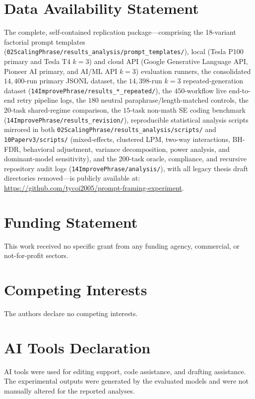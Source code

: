 \documentclass[a4paper,fleqn]{cas-sc}
\begin{document}
\section{Data Availability Statement}\label{data-availability-statement}

The complete, self-contained replication package—comprising the 18-variant factorial prompt templates (\texttt{02ScalingPhrase/results\_analysis/prompt\_templates/}), local (Tesla P100 primary and Tesla T4 $k=3$) and cloud API (Google Generative Language API, Pioneer AI primary, and AI/ML API $k=3$) evaluation runners, the consolidated $14{,}400$-run primary JSONL dataset, the $14{,}398$-run $k = 3$ repeated-generation dataset (\texttt{14ImprovePhrase/results\_*\_repeated/}), the $450$-workflow live end-to-end retry pipeline logs, the $180$ neutral paraphrase/length-matched controls, the $20$-task shared-regime comparison, the $15$-task non-math SE coding benchmark (\texttt{14ImprovePhrase/results\_revision/}), reproducible statistical analysis scripts mirrored in both \texttt{02ScalingPhrase/results\_analysis/scripts/} and \texttt{10Paperv3/scripts/} (mixed-effects, clustered LPM, two-way interactions, BH-FDR, behavioral adjustment, variance decomposition, power analysis, and dominant-model sensitivity), and the 200-task oracle, compliance, and recursive repository audit logs (\texttt{14ImprovePhrase/analysis/}), with all legacy thesis draft directories removed—is publicly available at: \url{https://github.com/tycoi2005/prompt-framing-experiment}.

\section{Funding Statement}\label{funding-statement}

This work received no specific grant from any funding agency, commercial, or not-for-profit sectors.

\section{Competing Interests}\label{competing-interests}

The authors declare no competing interests.

\section{AI Tools Declaration}\label{ai-tools-declaration}

AI tools were used for editing support, code assistance, and drafting assistance. The experimental outputs were generated by the evaluated models and were not manually altered for the reported analyses.
\end{document}
